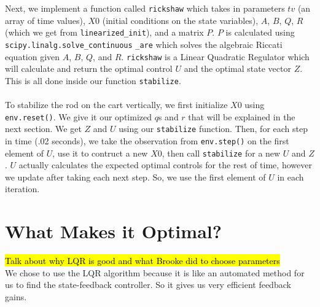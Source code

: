 \documentclass{hitec}
\begin{document}
	Next, we implement a function called \texttt{rickshaw} which takes in parameters $tv$ (an array of time values), $X0$ (initial conditions on the state variables), $A$, $B$, $Q$, $R$ (which we get from \texttt{linearized\_init}), and a matrix $P$. $P$ is calculated using \texttt{scipy.linalg.solve\_continuous} \texttt{\_are} which solves the algebraic Riccati equation given $A$, $B$, $Q$, and $R$. \texttt{rickshaw} is a Linear Quadratic Regulator which will calculate and return the optimal control $U$ and the optimal state vector $Z$. This is all done inside our function \texttt{stabilize}.\\\\
	To stabilize the rod on the cart vertically, we first initialize $X0$ using \texttt{env.reset()}. We give it our optimized $q$s and $r$ that will be explained in the next section. We get $Z$ and $U$ using our \texttt{stabilize} function. Then, for each step in time (.02 seconds), we take the observation from \texttt{env.step()} on the first element of $U$, use it to contruct a new $X0$, then call \texttt{stabilize} for a new $U$ and $Z$. $U$ actually calculates the expected optimal controls for the rest of time, however we update after taking each next step. So, we use the first element of $U$ in each iteration.
	
	\section{What Makes it Optimal?}
	\hl{Talk about why LQR is good and what Brooke did to choose parameters}\\
	We chose to use the LQR algorithm because it is like an automated method for us to find the state-feedback controller. So it gives us very efficient feedback gains.
	
	
	
\end{document}
